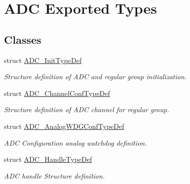 \hypertarget{group___a_d_c___exported___types}{\section{A\-D\-C Exported Types}
\label{group___a_d_c___exported___types}
}
\subsection*{Classes}
\begin{DoxyCompactItemize}
\item 
struct \hyperlink{struct_a_d_c___init_type_def}{A\-D\-C\-\_\-\-Init\-Type\-Def}
\begin{DoxyCompactList}\small\item\em Structure definition of A\-D\-C and regular group initialization. \end{DoxyCompactList}\item 
struct \hyperlink{struct_a_d_c___channel_conf_type_def}{A\-D\-C\-\_\-\-Channel\-Conf\-Type\-Def}
\begin{DoxyCompactList}\small\item\em Structure definition of A\-D\-C channel for regular group. \end{DoxyCompactList}\item 
struct \hyperlink{struct_a_d_c___analog_w_d_g_conf_type_def}{A\-D\-C\-\_\-\-Analog\-W\-D\-G\-Conf\-Type\-Def}
\begin{DoxyCompactList}\small\item\em A\-D\-C Configuration analog watchdog definition. \end{DoxyCompactList}\item 
struct \hyperlink{struct_a_d_c___handle_type_def}{A\-D\-C\-\_\-\-Handle\-Type\-Def}
\begin{DoxyCompactList}\small\item\em A\-D\-C handle Structure definition. \end{DoxyCompactList}\end{DoxyCompactItemize}
